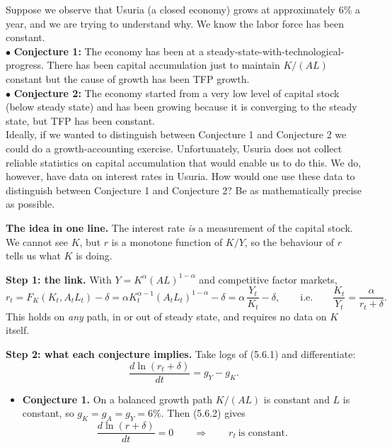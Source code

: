 \documentclass[12pt, letterpaper]{article}
\begin{document}
\begin{tcolorbox}[evenbox,title={Problem 5.6 \quad Interest Rates}]
\begin{tcolorbox}[questionbox]
Suppose we observe that Usuria (a closed economy) grows at approximately 6\% a year, and we
are trying to understand why. We know the labor force has been constant.\\[3pt]
$\bullet$ \textbf{Conjecture 1:} The economy has been at a steady-state-with-technological-progress.
There has been capital accumulation just to maintain $K/(AL)$ constant but the cause of
growth has been TFP growth.\\[3pt]
$\bullet$ \textbf{Conjecture 2:} The economy started from a very low level of capital stock (below
steady state) and has been growing because it is converging to the steady state, but TFP has
been constant.\\[3pt]
Ideally, if we wanted to distinguish between Conjecture 1 and Conjecture 2 we could do a
growth-accounting exercise. Unfortunately, Usuria does not collect reliable statistics on
capital accumulation that would enable us to do this. We do, however, have data on interest
rates in Usuria. How would one use these data to distinguish between Conjecture 1 and
Conjecture 2? Be as mathematically precise as possible.
\end{tcolorbox}

\textbf{The idea in one line.} The interest rate \emph{is} a measurement of the capital
stock. We cannot see $K$, but $r$ is a monotone function of $K/Y$, so the behaviour of $r$
tells us what $K$ is doing.

\smallskip
\textbf{Step 1: the link.} With $Y=K^{\alpha}(AL)^{1-\alpha}$ and competitive factor
markets,
\[
r_t=F_K(K_t,A_tL_t)-\delta=\alpha K_t^{\alpha-1}(A_tL_t)^{1-\alpha}-\delta
=\alpha\,\frac{Y_t}{K_t}-\delta ,
\qquad\text{i.e.}\qquad
\frac{K_t}{Y_t}=\frac{\alpha}{r_t+\delta}.
\tag{5.6.1}
\]
This holds on \emph{any} path, in or out of steady state, and requires no data on $K$
itself.

\smallskip
\textbf{Step 2: what each conjecture implies.} Take logs of (5.6.1) and differentiate:
\[
\frac{d\ln(r_t+\delta)}{dt}=g_Y-g_K .
\tag{5.6.2}
\]

\begin{itemize}[leftmargin=1.3em,itemsep=4pt,topsep=3pt]
\item \textbf{Conjecture 1.} On a balanced growth path $K/(AL)$ is constant and $L$ is
      constant, so $g_K=g_A=g_Y=6\%$. Then (5.6.2) gives
      \[
      \frac{d\ln(r+\delta)}{dt}=0
      \qquad\Longrightarrow\qquad
      \boxed{r_t\ \text{is constant}} .
      \]


\end{itemize}
\end{tcolorbox}
\end{document}

